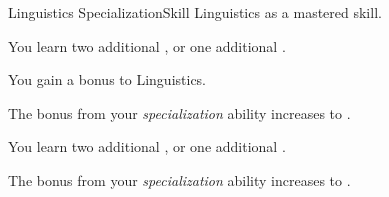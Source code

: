     \begin{feat}{Linguistics Specialization}{Skill}
        \featpre Linguistics as a mastered skill.

         You learn two additional , or one additional .

         You gain a  bonus to Linguistics.

         The bonus from your \textit{specialization} ability increases to .

         You learn two additional , or one additional .

         The bonus from your \textit{specialization} ability increases to .
    \end{feat}

